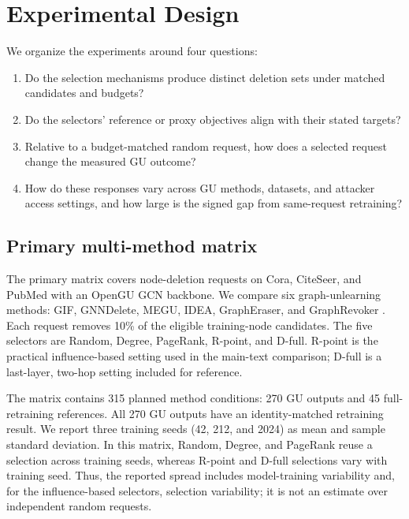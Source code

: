\section{Experimental Design}
\label{sec:experiments}

We organize the experiments around four questions:
\begin{enumerate}
  \item Do the selection mechanisms produce distinct deletion sets under matched candidates and budgets?
  \item Do the selectors' reference or proxy objectives align with their stated targets?
  \item Relative to a budget-matched random request, how does a selected request change the measured GU outcome?
  \item How do these responses vary across GU methods, datasets, and attacker access settings, and how large is the signed gap from same-request retraining?
\end{enumerate}

\subsection{Primary multi-method matrix}
The primary matrix covers node-deletion requests on Cora, CiteSeer, and PubMed with an OpenGU GCN backbone. We compare six graph-unlearning methods: GIF, GNNDelete, MEGU, IDEA, GraphEraser, and GraphRevoker \cite{wu2023gif,cheng2023gnndelete,li2024towards,dong2024idea,chen2022graph}. Each request removes 10\% of the eligible training-node candidates. The five selectors are Random, Degree, PageRank, R-point, and D-full. R-point is the practical influence-based setting used in the main-text comparison; D-full is a last-layer, two-hop setting included for reference.

The matrix contains 315 planned method conditions: 270 GU outputs and 45 full-retraining references. All 270 GU outputs have an identity-matched retraining result. We report three training seeds (42, 212, and 2024) as mean and sample standard deviation. In this matrix, Random, Degree, and PageRank reuse a selection across training seeds, whereas R-point and D-full selections vary with training seed. Thus, the reported spread includes model-training variability and, for the influence-based selectors, selection variability; it is not an estimate over independent random requests.


